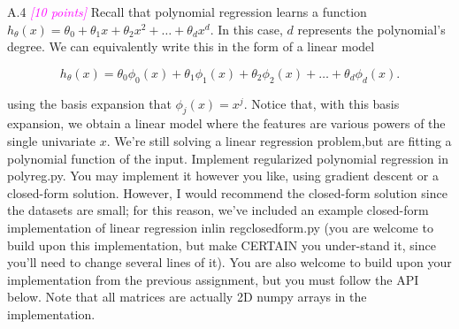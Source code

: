 \documentclass{article}
\newcommand{\1}{\mathbf{1}}
\newcommand{\points}[1]{\small\textcolor{magenta}{\emph{[#1 points]}} \normalsize}
\begin{document}
A.4 \points{10} Recall that polynomial regression learns a function $h_\theta(x) =\theta_0 + \theta_1x + \theta_2x^2 + \hdots +\theta_dx^d$. In this case, $d$ represents the polynomial’s degree. We can equivalently write this in the form of a linear model

$$h_\theta(x) =\theta_0\phi_0(x) + \theta_1\phi_1(x) + \theta_2\phi_2(x) + \hdots +\theta_d\phi_d(x).$$

using the basis expansion that $\phi_j(x) =x^j$. Notice that, with this basis expansion, we obtain a linear model where the features are various powers of the single univariate $x$. We’re still solving a linear regression problem,but are fitting a polynomial function of the input. Implement regularized polynomial regression in polyreg.py. You may implement it however you like, using gradient descent or a closed-form solution. However, I would recommend the closed-form solution since the datasets are small; for this reason, we’ve included an example closed-form implementation of linear regression inlin regclosedform.py (you are welcome to build upon this implementation, but make CERTAIN you under-stand it, since you’ll need to change several lines of it). You are also welcome to build upon your implementation from the previous assignment, but you must follow the API below. Note that all matrices are actually 2D numpy arrays in the implementation.
\end{document}
